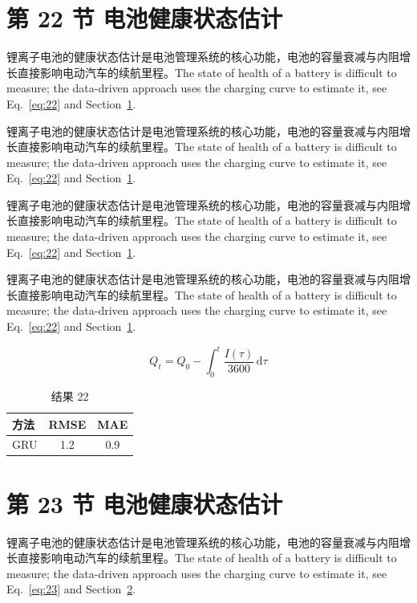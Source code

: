 \documentclass[UTF8,fontset=mac]{ctexart}
\begin{document}
\section{第 22 节 电池健康状态估计}\label{sec:22}
锂离子电池的健康状态估计是电池管理系统的核心功能，电池的容量衰减与内阻增长直接影响电动汽车的续航里程\cite{a2020}。The state of health of a battery is difficult to measure; the data-driven approach uses the charging curve to estimate it, see Eq.~\eqref{eq:22} and Section~\ref{sec:22}.

锂离子电池的健康状态估计是电池管理系统的核心功能，电池的容量衰减与内阻增长直接影响电动汽车的续航里程\cite{a2020}。The state of health of a battery is difficult to measure; the data-driven approach uses the charging curve to estimate it, see Eq.~\eqref{eq:22} and Section~\ref{sec:22}.

锂离子电池的健康状态估计是电池管理系统的核心功能，电池的容量衰减与内阻增长直接影响电动汽车的续航里程\cite{a2020}。The state of health of a battery is difficult to measure; the data-driven approach uses the charging curve to estimate it, see Eq.~\eqref{eq:22} and Section~\ref{sec:22}.

锂离子电池的健康状态估计是电池管理系统的核心功能，电池的容量衰减与内阻增长直接影响电动汽车的续航里程\cite{a2020}。The state of health of a battery is difficult to measure; the data-driven approach uses the charging curve to estimate it, see Eq.~\eqref{eq:22} and Section~\ref{sec:22}.

\begin{equation}\label{eq:22}
  Q_t = Q_0 - \int_0^t \frac{I(\tau)}{3600}\,\mathrm{d}\tau
\end{equation}
\begin{table}[h]\centering\begin{tabular}{lcc}\toprule 方法 & RMSE & MAE\\\midrule GRU & 1.2 & 0.9\\\bottomrule\end{tabular}\caption{结果 22}\end{table}

\section{第 23 节 电池健康状态估计}\label{sec:23}
锂离子电池的健康状态估计是电池管理系统的核心功能，电池的容量衰减与内阻增长直接影响电动汽车的续航里程\cite{a2020}。The state of health of a battery is difficult to measure; the data-driven approach uses the charging curve to estimate it, see Eq.~\eqref{eq:23} and Section~\ref{sec:23}.
\end{document}
